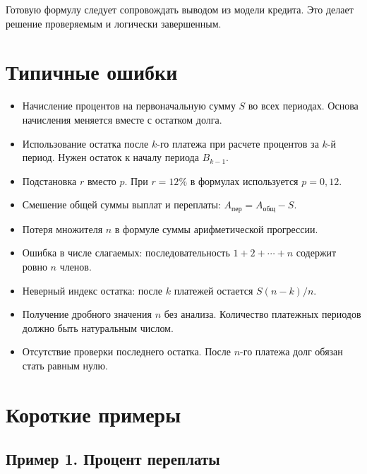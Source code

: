\documentclass[a4paper,12pt]{article}
\newcommand{\Total}{A_{\text{общ}}}
\newcommand{\Over}{A_{\text{пер}}}
\begin{document}
Готовую формулу следует сопровождать выводом из модели кредита.
Это делает решение проверяемым и логически завершенным.

\section{Типичные ошибки}

\begin{itemize}[leftmargin=1.5em,itemsep=0.3em]
  \item Начисление процентов на первоначальную сумму $S$ во всех
        периодах. Основа начисления меняется вместе с остатком долга.

  \item Использование остатка после $k$-го платежа при расчете
        процентов за $k$-й период. Нужен остаток к началу периода
        $B_{k-1}$.

  \item Подстановка $r$ вместо $p$. При $r=12\%$ в формулах
        используется $p=0{,}12$.

  \item Смешение общей суммы выплат и переплаты:
        $\Over=\Total-S$.

  \item Потеря множителя $n$ в формуле суммы арифметической
        прогрессии.

  \item Ошибка в числе слагаемых: последовательность
        $1+2+\cdots+n$ содержит ровно $n$ членов.

  \item Неверный индекс остатка: после $k$ платежей остается
        $S(n-k)/n$.

  \item Получение дробного значения $n$ без анализа. Количество
        платежных периодов должно быть натуральным числом.

  \item Отсутствие проверки последнего остатка. После $n$-го платежа
        долг обязан стать равным нулю.
\end{itemize}

\section{Короткие примеры}

\subsection*{Пример 1. Процент переплаты}
\end{document}
